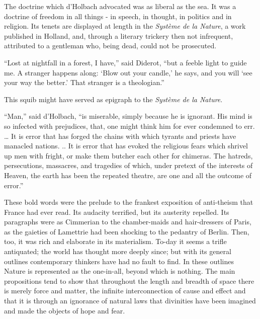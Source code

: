 \documentclass[]{book}
\begin{document}
The doctrine which d'Holbach advocated was as liberal as the sea. It was
a doctrine of freedom in all things - in speech, in thought, in politics
and in religion. Its tenets are displayed at length in the \emph{Système
de la Nature}, a work published in Holland, and, through a literary
trickery then not infrequent, attributed to a gentleman who, being dead,
could not be prosecuted.

``Lost at nightfall in a forest, I have,'' said Diderot, ``but a feeble
light to guide me. A stranger happens along: `Blow out your candle,' he
says, and you will `see your way the better.' That stranger is a
theologian.''

This squib might have served as epigraph to the \emph{Système de la
Nature}.

``Man,'' said d'Holbach, ``is miserable, simply because he is ignorant.
His mind is so infected with prejudices, that, one might think him for
ever condemned to err. \ldots{} It is error that has forged the chains
with which tyrants and priests have manacled nations. .. It is error
that has evoked the religious fears which shrivel up men with fright, or
make them butcher each other for chimeras. The hatreds, persecutions,
massacres, and tragedies of which, under pretext of the interests of
Heaven, the earth has been the repeated theatre, are one and all the
outcome of error.''

These bold words were the prelude to the frankest exposition of
anti-theism that France had ever read. Its audacity terrified, but its
austerity repelled. Its paragraphs were as Cimmerian to the
chamber-maids and hair-dressers of Paris, as the gaieties of Lamettrie
had been shocking to the pedantry of Berlin. Then, too, it was rich and
elaborate in its materialism. To-day it seems a trifle antiquated; the
world has thought more deeply since; but with its general outlines
contemporary thinkers have had no fault to find. In these outlines
Nature is represented as the one-in-all, beyond which is nothing. The
main propositions tend to show that throughout the length and breadth of
space there is merely force and matter, the infinite interconnection of
cause and effect and that it is through an ignorance of natural laws
that divinities have been imagined and made the objects of hope and
fear.
\end{document}
